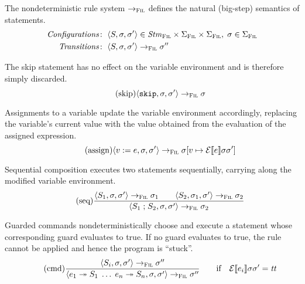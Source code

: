 \documentclass[a4paper,10pt,english]{article}
\begin{document}
The nondeterministic rule system $\rightarrow_{\textsc{Fil}}$ defines the natural (big-step) semantics of statements.
\begin{align*}
	\mathit{Configurations} \colon & \;\langle S, \sigma, \sigma' \rangle \in \mathit{Stm}_\textsc{Fil} \times \Sigma_\textsc{Fil} \times
	\Sigma_\textsc{Fil}, \; \sigma \in \Sigma_\textsc{Fil}
	\\
	\mathit{Transitions} \colon & \;\langle S, \sigma, \sigma' \rangle \rightarrow_{\textsc{Fil}} \sigma''
\end{align*}

The skip statement has no effect on the variable environment and is therefore simply discarded.
\begin{equation*}
	\tag{skip}
	\langle \mathtt{skip}, \sigma, \sigma' \rangle
		\rightarrow_{\textsc{Fil}}
	\sigma
\end{equation*}

Assignments to a variable update the variable environment accordingly, replacing the variable's current value with the value
obtained from the evaluation of the assigned expression.
\begin{equation*}
	\tag{assign}
	\langle v\; \mathtt{:=}\; e, \sigma, \sigma' \rangle
		\rightarrow_{\textsc{Fil}}
	\sigma[v \mapsto \mathcal{E} \llbracket e \rrbracket \sigma \sigma']
\end{equation*}

Sequential composition executes two statements sequentially, carrying along the modified variable environment.
\begin{equation*}
	\tag{seq}
	\dfrac
	{
		\langle S_1, \sigma, \sigma' \rangle
			\rightarrow_{\textsc{Fil}}
		\sigma_1
		\qquad
		\langle S_2, \sigma_1, \sigma' \rangle
			\rightarrow_{\textsc{Fil}}
		\sigma_2
	}
	{
		\langle S_1 \; \mathtt{;} \; S_2, \sigma, \sigma' \rangle
			\rightarrow_{\textsc{Fil}}
		\sigma_2
	}
\end{equation*}

Guarded commands nondeterministically choose and execute a statement whose corresponding guard evaluates to true. If no guard
evaluates to true, the rule cannot be applied and hence the program is ``stuck''.
\begin{equation*}
	\tag{cmd}
	\dfrac
	{
		\langle S_i, \sigma, \sigma' \rangle
			\rightarrow_{\textsc{Fil}}
		\sigma''
	}
	{
		\langle e_1 \; \mathtt{\twoheadrightarrow} \; S_1 \; \ldots \; e_n \; \mathtt{\twoheadrightarrow} \; S_n, \sigma, \sigma' \rangle
			\rightarrow_{\textsc{Fil}}
		\sigma''
	}
	\qquad \text{if} \quad \mathcal{E} \llbracket e_i \rrbracket \sigma \sigma' = \mathit{tt}
\end{equation*}
\end{document}
